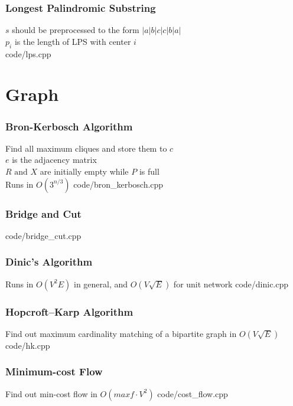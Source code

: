 \documentclass [landscape,8pt,a4paper,twocolumn]{article}
\begin{document}
\section{Longest Palindromic Substring}
$ s $ should be preprocessed to the form $ |a|b|c|c|b|a| $\\
$ p_i $ is the length of  LPS with center $ i $\\
 {code/lps.cpp}

\newpage
\part{Graph}

\section{Bron-Kerbosch Algorithm}
Find all maximum cliques and store them to $ c $ \\
$ e $ is the adjacency matrix \\
$ R \text{ and } X $ are initially empty while $ P $ is full \\
Runs in $ O(3^{n/3}) $
 {code/bron_kerbosch.cpp}

\section{Bridge and Cut}
 {code/bridge_cut.cpp}

\section{Dinic's Algorithm}
Runs in $ O(V^2E) $ in general, and $ O(V\sqrt{E}) $ for unit network
 {code/dinic.cpp}

\section{Hopcroft–Karp Algorithm}
Find out maximum cardinality matching of a bipartite graph in $ O(V\sqrt{E}) $
 {code/hk.cpp}

\section{Minimum-cost Flow}
Find out min-cost flow in $ O(maxf \cdot V^2) $
 {code/cost_flow.cpp}
\end{document}
